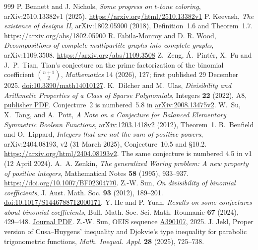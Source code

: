 \documentclass[11pt,a4paper]{article}
\begin{document}
\begin{thebibliography}{999}
P. Bennett and J. Nichols, \emph{Some progress on $t$-tone coloring}, arXiv:2510.13382v1 (2025). \url{https://arxiv.org/html/2510.13382v1}
P. Keevash, \emph{The existence of designs II}, arXiv:1802.05900 (2018), Definition~1.6 and Theorem~1.7. \url{https://arxiv.org/abs/1802.05900}
R. Fabila-Monroy and D. R. Wood, \emph{Decompositions of complete multipartite graphs into complete graphs}, arXiv:1109.3508. \url{https://arxiv.org/abs/1109.3508}
Z.~Zeng, \'A.~Pint\'er, X.~Fu and J.~P.~Tian,
Tian's conjecture on the prime factorization of the binomial
coefficient $\binom{n+1}{2}$,
\emph{Mathematics} 14 (2026), 127; first published
29 December 2025.
\href{https://doi.org/10.3390/math14010127}{doi:10.3390/math14010127}.
K.~Dilcher and M.~Ulas,
\emph{Divisibility and Arithmetic Properties of a Class of Sparse Polynomials},
Integers \textbf{22} (2022), A8,
\href{https://math.colgate.edu/~integers/w8/w8.pdf}{publisher PDF}.
Conjecture~2 is numbered~5.8 in \href{https://arxiv.org/abs/2008.13475v2}{arXiv:2008.13475v2}.
W.~Su, X.~Tang, and A.~Pott,
\emph{A Note on a Conjecture for Balanced Elementary Symmetric Boolean Functions},
\href{https://arxiv.org/abs/1203.1418v2}{arXiv:1203.1418v2} (2012),
Theorem~1.
B.~Benfield and O.~Lippard, \emph{Integers that are not the sum of
positive powers}, arXiv:2404.08193, v2 (31 March 2025),
Conjecture~10.5 and \S10.2.
\url{https://arxiv.org/html/2404.08193v2}.
The same conjecture is numbered 4.5 in v1 (12 April 2024).
A.~A. Zenkin, \emph{The generalized Waring problem: A new property
of positive integers}, Mathematical Notes \textbf{58} (1995),
933--937. \url{https://doi.org/10.1007/BF02304770}.
Z.-W. Sun, \emph{On divisibility of binomial coefficients},
J. Aust. Math. Soc. \textbf{93} (2012), 189--201.
\href{https://doi.org/10.1017/S1446788712000171}{doi:10.1017/S1446788712000171}.
Y. He and P. Yuan, \emph{Results on some conjectures about binomial
coefficients}, Bull. Math. Soc. Sci. Math. Roumanie \textbf{67}
(2024), 429--448.
\href{https://ssmr.ro/bulletin/pdf/67-4/articol_4.pdf}{Journal PDF}.
Z.-W. Sun, OEIS sequence \href{https://oeis.org/A390107}{A390107},
2025.
J. Jekl, Proper version of Cusa--Huygens' inequality and
Djokvie's type inequality for parabolic trigonometric functions,
\emph{Math. Inequal. Appl.} \textbf{28} (2025), 725--738.

\end{thebibliography}
\end{document}
